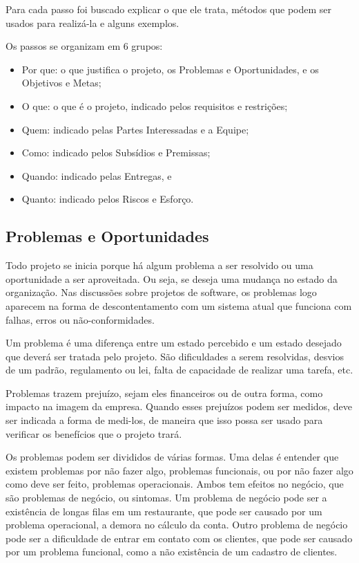 \documentclass{article}
\begin{document}
Para cada passo foi buscado explicar o que ele trata, métodos que podem ser usados para realizá-la e alguns exemplos.

Os passos se organizam em 6 grupos:
\begin{itemize}
    \item Por que: o que justifica o projeto, os Problemas e Oportunidades, e os Objetivos e Metas;
    \item O que: o que é o projeto, indicado pelos requisitos e restrições;
    \item Quem: indicado pelas Partes Interessadas e a Equipe;
    \item Como: indicado pelos Subsídios e Premissas;
    \item Quando: indicado pelas Entregas, e
    \item Quanto: indicado pelos Riscos e Esforço.
\end{itemize}

\subsection{Problemas e Oportunidades}

Todo projeto se inicia porque há algum problema a ser resolvido ou uma oportunidade a ser aproveitada. Ou seja, se deseja uma mudança no estado da organização. Nas discussões sobre projetos de software, os problemas logo aparecem na forma de descontentamento com um sistema atual que funciona com falhas, erros ou não-conformidades.

Um problema é uma diferença entre um estado percebido e um estado desejado que deverá ser tratada pelo projeto. São dificuldades a serem resolvidas, desvios de um padrão, regulamento ou lei, falta de capacidade de realizar uma tarefa, etc. 

Problemas trazem prejuízo, sejam eles financeiros ou de outra forma, como impacto na imagem da empresa. Quando esses prejuízos podem ser medidos, deve ser indicada a forma de medi-los, de maneira que isso possa ser usado para verificar os benefícios que o projeto trará.

Os problemas podem ser divididos de várias formas. Uma delas é entender que existem problemas por não fazer algo, problemas funcionais, ou por não fazer algo como deve ser feito, problemas operacionais. Ambos tem efeitos no negócio, que são problemas de negócio, ou sintomas. Um problema de negócio pode ser a existência de longas filas em um restaurante, que pode ser causado por um problema operacional, a demora no cálculo da conta. Outro problema de negócio pode ser a dificuldade de entrar em contato com os clientes, que pode ser causado por um problema funcional, como a não existência de um cadastro de clientes.
\end{document}
